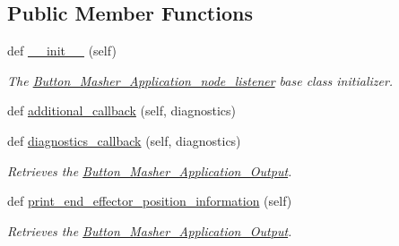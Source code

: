 \subsection*{Public Member Functions}
\begin{DoxyCompactItemize}
\item 
def \hyperlink{classButton__Masher__Application__Output_1_1Button__Masher__Application__node__listener_ae64f0875afe3067b97ba370b354b9213}{\+\_\+\+\_\+init\+\_\+\+\_\+} (self)
\begin{DoxyCompactList}\small\item\em The \hyperlink{classButton__Masher__Application__Output_1_1Button__Masher__Application__node__listener}{Button\+\_\+\+Masher\+\_\+\+Application\+\_\+node\+\_\+listener} base class initializer. \end{DoxyCompactList}\item 
def \hyperlink{classButton__Masher__Application__Output_1_1Button__Masher__Application__node__listener_ab35c2e69050a4f7d87cf90a41f087211}{additional\+\_\+callback} (self, diagnostics)
\item 
def \hyperlink{classButton__Masher__Application__Output_1_1Button__Masher__Application__node__listener_ab3b9e5b2975cf90154645eee1c579708}{diagnostics\+\_\+callback} (self, diagnostics)
\begin{DoxyCompactList}\small\item\em Retrieves the \hyperlink{namespaceButton__Masher__Application__Output}{Button\+\_\+\+Masher\+\_\+\+Application\+\_\+\+Output}. \end{DoxyCompactList}\item 
def \hyperlink{classButton__Masher__Application__Output_1_1Button__Masher__Application__node__listener_a123cdc0332063476801ee93d615ea911}{print\+\_\+end\+\_\+effector\+\_\+position\+\_\+information} (self)
\begin{DoxyCompactList}\small\item\em Retrieves the \hyperlink{namespaceButton__Masher__Application__Output}{Button\+\_\+\+Masher\+\_\+\+Application\+\_\+\+Output}. \end{DoxyCompactList}\end{DoxyCompactItemize}
